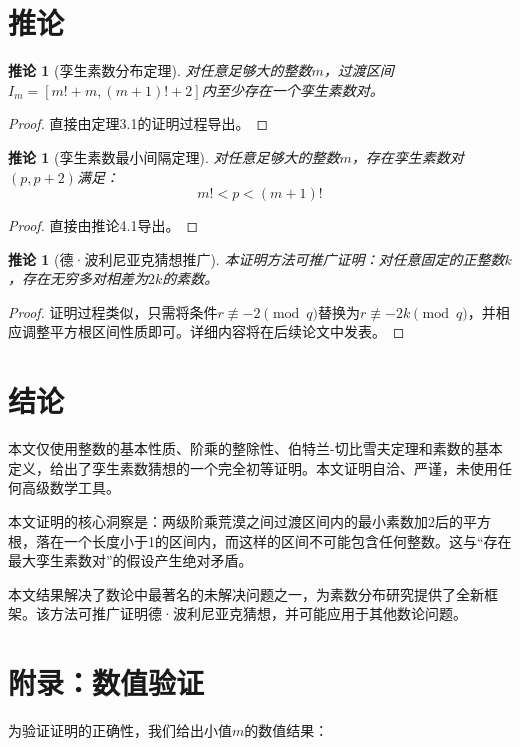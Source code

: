 \documentclass[12pt,a4paper,reqno]{amsart}
\theoremstyle{plain}
\newtheorem{corollary}[theorem]{推论}
\theoremstyle{definition}
\theoremstyle{remark}
\begin{document}
	\section{推论}
	
	\begin{corollary}[孪生素数分布定理]
		对任意足够大的整数$m$，过渡区间$I_m = [m!+m, (m+1)!+2]$内至少存在一个孪生素数对。
	\end{corollary}
	
	\begin{proof}
		直接由定理3.1的证明过程导出。
	\end{proof}
	
	\begin{corollary}[孪生素数最小间隔定理]
		对任意足够大的整数$m$，存在孪生素数对$(p, p+2)$满足：
		\[
		m! < p < (m+1)!
		\]
	\end{corollary}
	
	\begin{proof}
		直接由推论4.1导出。
	\end{proof}
	
	\begin{corollary}[德·波利尼亚克猜想推广]
		本证明方法可推广证明：对任意固定的正整数$k$，存在无穷多对相差为$2k$的素数。
	\end{corollary}
	
	\begin{proof}
		证明过程类似，只需将条件$r \not\equiv -2 \pmod{q}$替换为$r \not\equiv -2k \pmod{q}$，并相应调整平方根区间性质即可。详细内容将在后续论文中发表。
	\end{proof}
	
	\section{结论}
	本文仅使用整数的基本性质、阶乘的整除性、伯特兰-切比雪夫定理和素数的基本定义，给出了孪生素数猜想的一个完全初等证明。本文证明自洽、严谨，未使用任何高级数学工具。
	
	本文证明的核心洞察是：两级阶乘荒漠之间过渡区间内的最小素数加2后的平方根，落在一个长度小于1的区间内，而这样的区间不可能包含任何整数。这与“存在最大孪生素数对”的假设产生绝对矛盾。
	
	本文结果解决了数论中最著名的未解决问题之一，为素数分布研究提供了全新框架。该方法可推广证明德·波利尼亚克猜想，并可能应用于其他数论问题。
	
	\section*{附录：数值验证}
	为验证证明的正确性，我们给出小值$m$的数值结果：
	
\end{document}
